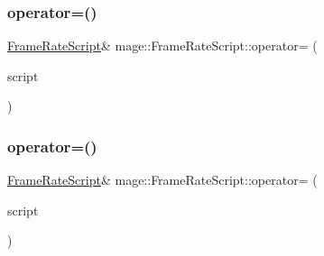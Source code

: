 \hypertarget{classmage_1_1_frame_rate_script_a2077ec2facadcde117a20d18e2f0e9b7}{}\label{classmage_1_1_frame_rate_script_a2077ec2facadcde117a20d18e2f0e9b7} 
\subsubsection{\texorpdfstring{operator=()}{operator=()}\hspace{0.1cm}{\footnotesize\ttfamily [1/2]}}
{\footnotesize\ttfamily \hyperlink{classmage_1_1_frame_rate_script}{Frame\+Rate\+Script}\& mage\+::\+Frame\+Rate\+Script\+::operator= (\begin{DoxyParamCaption}\item[{const \hyperlink{classmage_1_1_frame_rate_script}{Frame\+Rate\+Script} \&}]{script }\end{DoxyParamCaption})\hspace{0.3cm}{\ttfamily [delete]}}

\hypertarget{classmage_1_1_frame_rate_script_a828664f89350ac0da2da3da26c05a6f0}{}\label{classmage_1_1_frame_rate_script_a828664f89350ac0da2da3da26c05a6f0} 
\subsubsection{\texorpdfstring{operator=()}{operator=()}\hspace{0.1cm}{\footnotesize\ttfamily [2/2]}}
{\footnotesize\ttfamily \hyperlink{classmage_1_1_frame_rate_script}{Frame\+Rate\+Script}\& mage\+::\+Frame\+Rate\+Script\+::operator= (\begin{DoxyParamCaption}\item[{\hyperlink{classmage_1_1_frame_rate_script}{Frame\+Rate\+Script} \&\&}]{script }\end{DoxyParamCaption})\hspace{0.3cm}{\ttfamily [delete]}}

\hypertarget{classmage_1_1_frame_rate_script_a9bab0b26279823f1387428268b30e034}{}\label{classmage_1_1_frame_rate_script_a9bab0b26279823f1387428268b30e034} 
